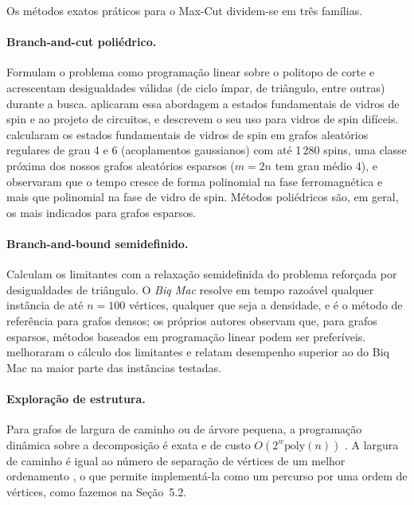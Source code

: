 Os métodos exatos práticos para o Max-Cut dividem-se em três famílias.

\paragraph{Branch-and-cut poliédrico.} Formulam o problema como programação linear sobre o politopo de corte e acrescentam desigualdades válidas (de ciclo ímpar, de triângulo, entre outras) durante a busca. \citet{Barahona et al. 1988} aplicaram essa abordagem a estados fundamentais de vidros de spin e ao projeto de circuitos, e \citet{Liers et al. 2004} descrevem o seu uso para vidros de spin difíceis. \citet{Liers et al. 2003} calcularam os estados fundamentais de vidros de spin em grafos aleatórios regulares de grau 4 e 6 (acoplamentos gaussianos) com até 1\,280 spins, uma classe próxima dos nossos grafos aleatórios esparsos ($m=2n$ tem grau médio 4), e observaram que o tempo cresce de forma polinomial na fase ferromagnética e mais que polinomial na fase de vidro de spin. Métodos poliédricos são, em geral, os mais indicados para grafos esparsos.

\paragraph{Branch-and-bound semidefinido.} Calculam os limitantes com a relaxação semidefinida do problema reforçada por desigualdades de triângulo. O \emph{Biq Mac} \cite{Rendl et al. 2010} resolve em tempo razoável qualquer instância de até $n=100$ vértices, qualquer que seja a densidade, e é o método de referência para grafos densos; os próprios autores observam que, para grafos esparsos, métodos baseados em programação linear podem ser preferíveis. \citet{Krislock et al. 2014} melhoraram o cálculo dos limitantes e relatam desempenho superior ao do Biq Mac na maior parte das instâncias testadas.

\paragraph{Exploração de estrutura.} Para grafos de largura de caminho ou de árvore pequena, a programação dinâmica sobre a decomposição é exata e de custo $O(2^{w}\mathrm{poly}(n))$ \cite{Arnborg et al. 1991, Bodlaender 1993}. A largura de caminho é igual ao número de separação de vértices de um melhor ordenamento \cite{Kinnersley 1992}, o que permite implementá-la como um percurso por uma ordem de vértices, como fazemos na Seção~5.2.

